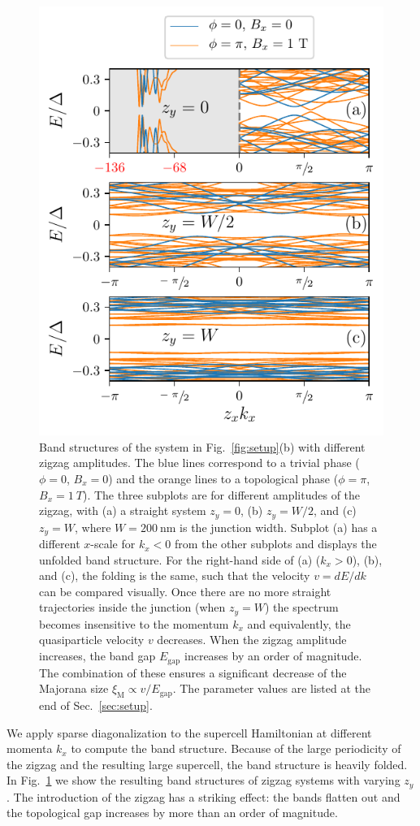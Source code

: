 \begin{figure}
\begin{center}
\includegraphics[width=0.6\columnwidth]{chapter_zigzag/figures/bandstructures}
\caption{Band structures of the system in Fig.~\ref{fig:setup}(b) with different zigzag amplitudes.
The blue lines correspond to a trivial phase ($\phi=0$, $B_x = 0$) and the orange lines to a topological phase ($\phi=\pi$, $B_x = \SI{1}{T}$).
The three subplots are for different amplitudes of the zigzag, with (a) a straight system $z_y=0$, (b) $z_y=W/2$, and (c) $z_y=W$, where $W=\SI{200}{\nm}$ is the junction width.
Subplot (a) has a different $x$-scale for $k_x < 0$ from the other subplots and displays the unfolded band structure.
For the right-hand side of (a) ($k_x > 0$), (b), and (c), the folding is the same, such that the velocity $v=dE/dk$ can be compared visually.
Once there are no more straight trajectories inside the junction (when $z_y=W$) the spectrum becomes insensitive to the momentum $k_x$ and equivalently, the quasiparticle velocity $v$ decreases.
When the zigzag amplitude increases, the band gap $E_\textrm{gap}$ increases by an order of magnitude.
The combination of these ensures a significant decrease of the Majorana size $\xi_\textrm{M} \propto v/E_\textrm{gap}$.
The parameter values are listed at the end of Sec.~\ref{sec:setup}.\label{fig:band_structures}}
\end{center}
\end{figure}

We apply sparse diagonalization to the supercell Hamiltonian at different momenta $k_x$ to compute the band structure.
Because of the large periodicity of the zigzag and the resulting large supercell, the band structure is heavily folded.
In Fig.~\ref{fig:band_structures} we show the resulting band structures of zigzag systems with varying $z_y$.
The introduction of the zigzag has a striking effect: the bands flatten out and the topological gap increases by more than an order of magnitude.

